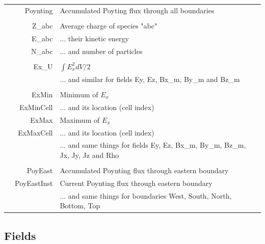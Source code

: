 \documentclass[11pt]{article}
\begin{document}
\begin{longtabu}{X r | l X}
& Poynting & Accumulated Poyting flux through all boundaries&\\
& & & \\
& Z\_abc & Average charge of species "abc" &\\
& E\_abc & ... their kinetic energy &\\
& N\_abc & ... and number of particles &\\
& & & \\
& Ex\_U & $\int E_x^2 dV /2$ & \\
& & ... and similar for fields Ey, Ez, Bx\_m, By\_m and Bz\_m & \\
& & & \\
& ExMin & Minimum of $E_x$ & \\
& ExMinCell &  ... and its location (cell index) & \\
& ExMax & Maximum of $E_x$ & \\
& ExMaxCell &  ... and its location (cell index) & \\
& & ... and same things for fields Ey, Ez, Bx\_m, By\_m, Bz\_m, Jx, Jy, Jz and Rho & \\
& & & \\
& PoyEast & Accumulated Poynting flux through eastern boundary & \\
& PoyEastInst & Current Poynting flux through eastern boundary & \\
& & ... and same things for boundaries West, South, North, Bottom, Top &\\
\end{longtabu}


\subsection{Fields\label{sec:fields}}
\end{document}
